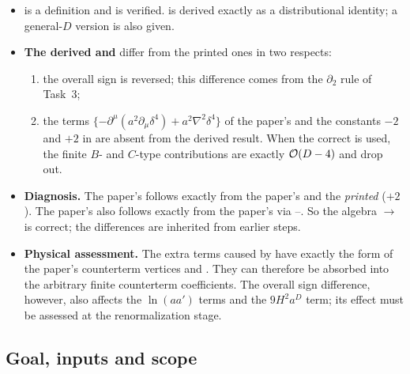 \begin{discbox}
\begin{itemize}[leftmargin=1.2em,nosep]
\item {} is a definition and is verified.  is derived exactly as a
distributional identity; a general-\(D\) version is also given.
\item \textbf{The derived  and } differ from the printed ones in two respects:
\begin{enumerate}[nosep]
\item the overall sign is reversed; this difference comes from the \(\partial_2\) rule of
Task~3;
\item the terms \(\{-\partial^\mu(a^2\partial_\mu\delta^4)+a^2\nabla^2\delta^4\}\) of the paper's
 and the constants \(-2\) and \(+2\) in  are absent from the derived result.
When the correct  is used, the finite \(B\)- and \(C\)-type contributions are exactly
\(\mathcal{O}\!\left(D-4\right)\) and drop out.
\end{enumerate}
\item \textbf{Diagnosis.} The paper's  follows exactly from the paper's  and the
\emph{printed}  (\(+2\)). The paper's  also follows exactly from the paper's
 via --. So the algebra \(\to\) is correct; the
differences are inherited from earlier steps.
\item \textbf{Physical assessment.} The extra terms caused by  have exactly the form of
the paper's counterterm vertices  and . They can therefore be absorbed
into the arbitrary finite counterterm coefficients. The overall sign difference, however,
also affects the \(\ln(aa')\) terms and the \(9H^2a^D\) term; its effect must be assessed
at the renormalization stage.
\end{itemize}
\end{discbox}

\subsection{Goal, inputs and scope}

